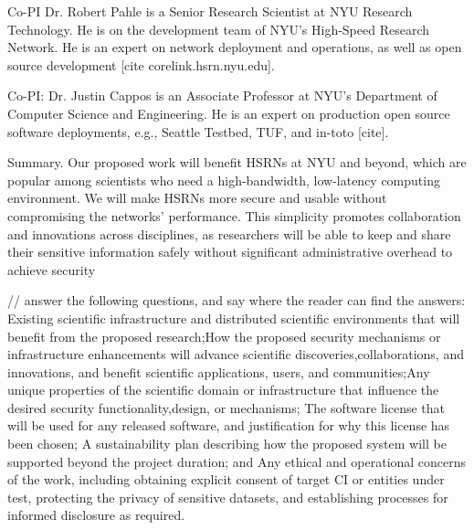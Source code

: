 Co-PI Dr. Robert Pahle is a Senior Research Scientist at NYU Research Technology. He is on the development team of NYU's High-Speed Research Network. He is an expert on network deployment and operations, as well as open source development [cite corelink.hsrn.nyu.edu].

Co-PI: Dr. Justin Cappos is an Associate Professor at NYU's Department of Computer Science and Engineering. He is an expert on production open source software deployments, e.g., Seattle Testbed, TUF, and in-toto [cite].

Summary. Our proposed work will benefit HSRNs at NYU and beyond, which are popular among scientists who need a high-bandwidth, low-latency computing environment. We will make HSRNs more secure and usable without compromising the networks' performance. This simplicity promotes collaboration and innovations across disciplines, as researchers will be able to keep and share their sensitive information safely without significant administrative overhead to achieve security

// answer the following questions, and say where the reader can find the answers: Existing scientific infrastructure and distributed scientific environments that will benefit from the proposed research;How the proposed security mechanisms or infrastructure enhancements will advance scientific discoveries,collaborations, and innovations, and benefit scientific applications, users, and communities;Any unique properties of the scientific domain or infrastructure that influence the desired security functionality,design, or mechanisms; The software license that will be used for any released software, and justification for why this license has been chosen; A sustainability plan describing how the proposed system will be supported beyond the project duration; and Any ethical and operational concerns of the work, including obtaining explicit consent of target CI or entities under test, protecting the privacy of sensitive datasets, and establishing processes for informed disclosure as required.

